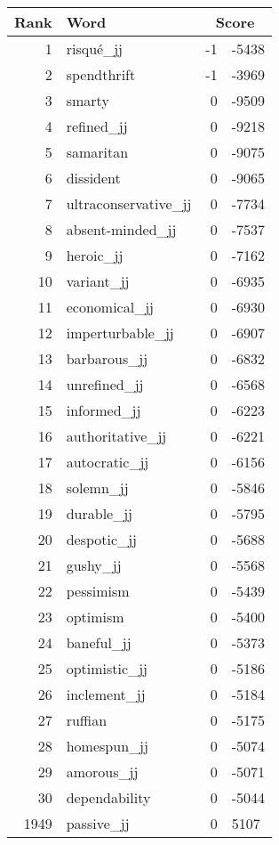 \begin{longtable}[!htbp]{| rlr@{.}l |}
    \hline
    \textbf{Rank} & \textbf{Word} & \multicolumn{2}{c|}{\textbf{Score}} \\
    \hline
    \endhead
    1 & risqué\_jj & -1 & -5438 \\
    2 & spendthrift & -1 & -3969 \\
    3 & smarty & 0 & -9509 \\
    4 & refined\_jj & 0 & -9218 \\
    5 & samaritan & 0 & -9075 \\
    6 & dissident & 0 & -9065 \\
    7 & ultraconservative\_jj & 0 & -7734 \\
    8 & absent-minded\_jj & 0 & -7537 \\
    9 & heroic\_jj & 0 & -7162 \\
    10 & variant\_jj & 0 & -6935 \\
    11 & economical\_jj & 0 & -6930 \\
    12 & imperturbable\_jj & 0 & -6907 \\
    13 & barbarous\_jj & 0 & -6832 \\
    14 & unrefined\_jj & 0 & -6568 \\
    15 & informed\_jj & 0 & -6223 \\
    16 & authoritative\_jj & 0 & -6221 \\
    17 & autocratic\_jj & 0 & -6156 \\
    18 & solemn\_jj & 0 & -5846 \\
    19 & durable\_jj & 0 & -5795 \\
    20 & despotic\_jj & 0 & -5688 \\
    21 & gushy\_jj & 0 & -5568 \\
    22 & pessimism & 0 & -5439 \\
    23 & optimism & 0 & -5400 \\
    24 & baneful\_jj & 0 & -5373 \\
    25 & optimistic\_jj & 0 & -5186 \\
    26 & inclement\_jj & 0 & -5184 \\
    27 & ruffian & 0 & -5175 \\
    28 & homespun\_jj & 0 & -5074 \\
    29 & amorous\_jj & 0 & -5071 \\
    30 & dependability & 0 & -5044 \\
    1949 & passive\_jj & 0 & 5107 \\

\end{longtable}
